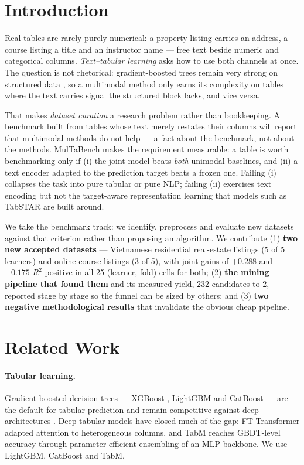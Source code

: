 \documentclass[10pt,letterpaper]{article}
\begin{document}
\section{Introduction}

Real tables are rarely purely numerical: a property listing carries an address, a course
listing a title and an instructor name --- free text beside numeric and categorical columns.
\emph{Text--tabular learning} asks how to use both channels at once. The question is not
rhetorical: gradient-boosted trees remain very strong on structured data
\cite{grinsztajn,shwartzziv}, so a multimodal method only earns its complexity on tables where
the text carries signal the structured block lacks, and vice versa.

That makes \emph{dataset curation} a research problem rather than bookkeeping. A benchmark
built from tables whose text merely restates their columns will report that multimodal methods
do not help --- a fact about the benchmark, not about the methods. MulTaBench \cite{multabench}
makes the requirement measurable: a table is worth benchmarking only if (i) the joint model
beats \emph{both} unimodal baselines, and (ii) a text encoder adapted to the prediction target
beats a frozen one. Failing (i) collapses the task into pure tabular or pure NLP; failing (ii)
exercises text encoding but not the target-aware representation learning that models such as
TabSTAR \cite{tabstar} are built around.

We take the benchmark track: we identify, preprocess and evaluate new datasets against that
criterion rather than proposing an algorithm. We contribute (1) \textbf{two new accepted
datasets} --- Vietnamese residential real-estate listings (5 of 5 learners) and online-course
listings (3 of 5), with joint gains of $+0.288$ and $+0.175$ $R^2$ positive in all 25 (learner,
fold) cells for both; (2) \textbf{the mining pipeline that found them} and its measured yield,
232 candidates to 2, reported stage by stage so the funnel can be sized by others; and (3)
\textbf{two negative methodological results} that invalidate the obvious cheap pipeline.

\section{Related Work}

\paragraph{Tabular learning.} Gradient-boosted decision trees --- XGBoost \cite{xgboost},
LightGBM \cite{lightgbm} and CatBoost \cite{catboost} --- are the default for tabular
prediction and remain competitive against deep architectures \cite{grinsztajn,shwartzziv}. Deep
tabular models have closed much of the gap: FT-Transformer \cite{fttransformer} adapted
attention to heterogeneous columns, and TabM \cite{tabm} reaches GBDT-level accuracy through
parameter-efficient ensembling of an MLP backbone. We use LightGBM, CatBoost and TabM.
\end{document}
